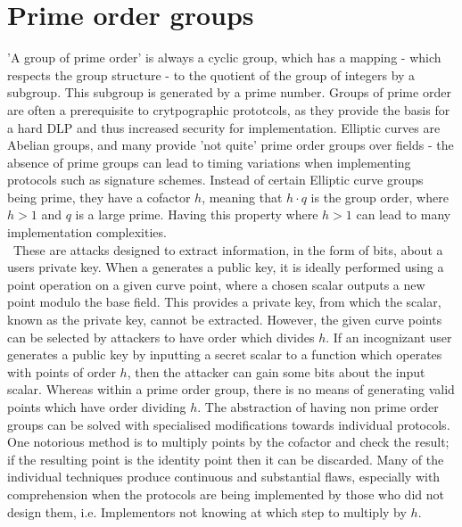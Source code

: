 \documentclass{article}
\begin{document}
\section{Prime order groups}
'A group of prime order' is always a cyclic group,  which has a mapping - which respects the group structure - to the quotient of the group of integers by a subgroup. This subgroup is generated by a prime number. Groups of prime order are often a prerequisite to crytpographic prototcols, as they provide the basis for a hard DLP and thus increased security for implementation. Elliptic curves are Abelian groups, and many provide 'not quite' prime order groups over fields - the absence of prime groups can lead to timing variations when implementing protocols such as signature schemes. Instead of certain Elliptic curve groups being prime, they have a cofactor $h$, meaning that $h \cdot q$ is the group order, where $h > 1$ and $q$ is a large prime. Having this property where $h > 1$ can lead to many implementation complexities. \\\
These are attacks designed to extract information, in the form of bits, about a users private key. When a generates a public key, it is ideally performed using a point operation on a given curve point, where a chosen scalar outputs a new point modulo the base field. This provides a private key, from which the scalar, known as the private key, cannot be extracted. However, the given curve points can be selected by attackers to have order which divides $h$. If an incognizant user generates a public key by inputting a secret scalar to a function which operates with points of order $h$, then the attacker can gain some bits about the input scalar. Whereas within a prime order group, there is no means of generating valid points which have order dividing $h$. The abstraction of having non prime order groups can be solved with specialised modifications towards individual protocols. One notorious method is to multiply points by the cofactor and check the result; if the resulting point is the identity point then it can be discarded. Many of the individual techniques produce continuous and substantial flaws, especially with comprehension when the protocols are being implemented by those who did not design them, i.e. Implementors not knowing at which step to multiply by $h$. 
\end{document}

